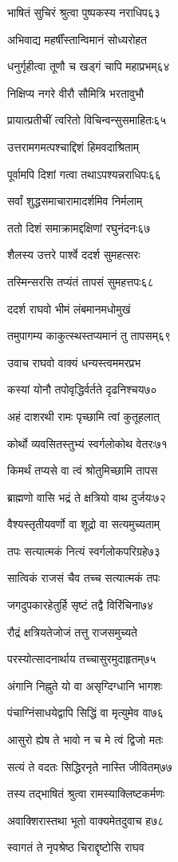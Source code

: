 भाषितं सुचिरं श्रुत्वा पुष्पकस्य नराधिप६३

अभिवाद्य महर्षींस्तान्विमानं सोध्यरोहत

धनुर्गृहीत्वा तूणौ च खड्गं चापि महाप्रभम्६४

निक्षिप्य नगरे वीरौ सौमित्रि भरतावुभौ

प्रायात्प्रतीचीं त्वरितो विचिन्वन्सुसमाहितः६५

उत्तरामगमत्पश्चाद्दिशं हिमवदाश्रिताम्

पूर्वामपि दिशां गत्वा तथाऽपश्यन्नराधिपः६६

सर्वां शुद्धसमाचारामादर्शमिव निर्मलाम्

ततो दिशं समाक्रामद्दक्षिणां रघुनंदनः६७

शैलस्य उत्तरे पार्श्वे ददर्श सुमहत्सरः

तस्मिन्सरसि तप्यंतं तापसं सुमहत्तपः६८

ददर्श राघवो भीमं लंबमानमधोमुखं

तमुपागम्य काकुत्स्थस्तप्यमानं तु तापसम्६९

उवाच राघवो वाक्यं धन्यस्त्वममरप्रभ

कस्यां योनौ तपोवृद्धिर्वर्तते दृढनिश्चय७०

अहं दाशरथी रामः पृच्छामि त्वां कुतूहलात्

कोर्थो व्यवसितस्तुभ्यं स्वर्गलोकोथ वेतरः७१

किमर्थं तप्यसे वा त्वं श्रोतुमिच्छामि तापस

ब्राह्मणो वासि भद्रं ते क्षत्रियो वाथ दुर्जयः७२

वैश्यस्तृतीयवर्णो वा शूद्रो वा सत्यमुच्यताम्

तपः सत्यात्मकं नित्यं स्वर्गलोकपरिग्रहे७३

सात्विकं राजसं चैव तच्च सत्यात्मकं तपः

जगदुपकारहेतुर्हि सृष्टं तद्वै विरिंचिना७४

रौद्रं क्षत्रियतेजोजं तत्तु राजसमुच्यते

परस्योत्सादनार्थाय तच्चासुरमुदाहृतम्७५

अंगानि निह्नुते यो वा असृग्दिग्धानि भागशः

पंचाग्निंसाधयेद्वापि सिद्धिं वा मृत्युमेव वा७६

आसुरो ह्येष ते भावो न च मे त्वं द्विजो मतः

सत्यं ते वदतः सिद्धिरनृते नास्ति जीवितम्७७

तस्य तद्भाषितं श्रुत्वा रामस्याक्लिष्टकर्मणः

अवाक्शिरास्तथा भूतो वाक्यमेतदुवाच ह७८

स्वागतं ते नृपश्रेष्ठ चिराद्दृष्टोसि राघव

